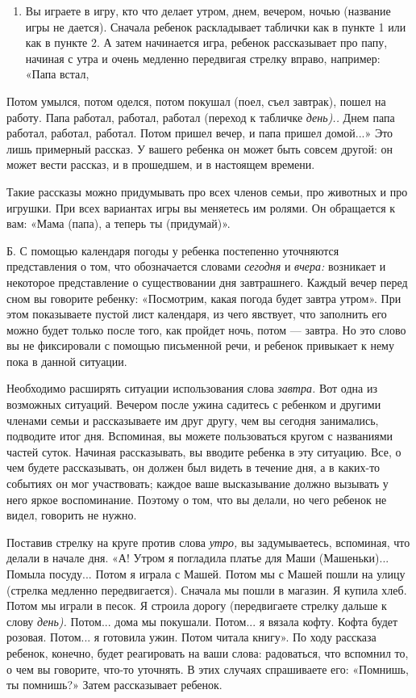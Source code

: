 \documentclass[a5paper]{book}
\renewcommand{\emph}[1]{\textit{#1}}
\begin{document}
\begin{enumerate}
\def\labelenumi{\arabic{enumi}.}
\setcounter{enumi}{2}
\item
  
  Вы играете в игру, кто что делает утром, днем, вечером, ночью
  (название игры не дается). Сначала ребенок раскладывает таблички как в
  пункте 1 или как в пункте 2. А затем начинается игра, ребенок
  рассказывает про папу, начиная с утра и очень медленно передвигая
  стрелку вправо, например: «Папа встал,
  
\end{enumerate}


Потом умылся, потом оделся, потом покушал (поел, съел завтрак), пошел на
работу. Папа работал, работал, работал (переход к табличке
\emph{день)..} Днем папа работал, работал, работал. Потом пришел вечер,
и папа пришел домой...» Это лишь примерный рассказ. У вашего ребенка он
может быть совсем другой: он может вести рассказ, и в прошедшем, и в
настоящем времени.

Такие рассказы можно придумывать про всех членов семьи, про животных и
про игрушки. При всех вариантах игры вы меняетесь им ролями. Он
обращается к вам: «Мама (папа), а теперь ты (придумай)».

Б. С помощью календаря погоды у ребенка постепенно уточняются
представления о том, что обозначается словами \emph{сегодня} и
\emph{вчера:} возникает и некоторое представление о существовании дня
завтрашнего. Каждый вечер перед сном вы говорите ребенку: «Посмотрим,
какая погода будет завтра утром». При этом показываете пустой лист
календаря, из чего явствует, что заполнить его можно будет только после
того, как пройдет ночь, потом --- завтра. Но это слово вы не фиксировали
с помощью письменной речи, и ребенок привыкает к нему пока в данной
ситуации.

Необходимо расширять ситуации использования слова \emph{завтра.} Вот
одна из возможных ситуаций. Вечером после ужина садитесь с ребенком и
другими членами семьи и рассказываете им друг другу, чем вы сегодня
занимались, подводите итог дня. Вспоминая, вы можете пользоваться кругом
с названиями частей суток. Начиная рассказывать, вы вводите ребенка в
эту ситуацию. Все, о чем будете рассказывать, он должен был видеть в
течение дня, а в каких-то событиях он мог участвовать; каждое ваше
высказывание должно вызывать у него яркое воспоминание. Поэтому о том,
что вы делали, но чего ребенок не видел, говорить не нужно.

Поставив стрелку на круге против слова \emph{утро,} вы задумываетесь,
вспоминая, что делали в начале дня. «А! Утром я погладила платье для
Маши (Машеньки)... Помыла посуду... Потом я играла с Машей. Потом мы с
Машей пошли на улицу (стрелка медленно передвигается). Сначала мы пошли
в магазин. Я купила хлеб. Потом мы играли в песок. Я строила дорогу
(передвигаете стрелку дальше к слову \emph{день).} Потом... дома мы
покушали. Потом... я вязала кофту. Кофта будет розовая. Потом... я
готовила ужин. Потом читала книгу». По ходу рассказа ребенок, конечно,
будет реагировать на ваши слова: радоваться, что вспомнил то, о чем вы
говорите, что-то уточнять. В этих случаях спрашиваете его: «Помнишь, ты
помнишь?» Затем рассказывает ребенок.
\end{document}
